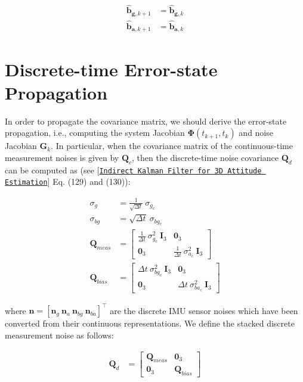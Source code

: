 \begin{align*} \hat{\mathbf{b}}_{\mathbf{g},k+1} &= \hat{\mathbf{b}}_{\mathbf{g},k}\\ \hat{\mathbf{b}}_{\mathbf{a},k+1} &= \hat{\mathbf{b}}_{\mathbf{a},k} \end{align*}\hypertarget{propagation_error_prop}{}\section{Discrete-\/time Error-\/state Propagation}\label{propagation_error_prop}
In order to propagate the covariance matrix, we should derive the error-\/state propagation, i.\+e., computing the system Jacobian $\boldsymbol{\Phi}(t_{k+1},t_k)$ and noise Jacobian $\mathbf{G}_{k}$. In particular, when the covariance matrix of the continuous-\/time measurement noises is given by $\mathbf{Q}_c$, then the discrete-\/time noise covariance $\mathbf{Q}_d$ can be computed as (see \mbox{[}\href{http://mars.cs.umn.edu/tr/reports/Trawny05b.pdf}{\tt Indirect Kalman Filter for 3D Attitude Estimation}\mbox{]} \cite{Trawny2005TR} Eq. (129) and (130))\+:

\begin{align*} \sigma_{g} &= \frac{1}{\sqrt{\Delta t}}~ \sigma_{g_c} \\ \sigma_{bg} &= \sqrt{\Delta t}~ \sigma_{bg_c} \\[1em] \mathbf{Q}_{meas} &= \begin{bmatrix} \frac{1}{\Delta t}~ \sigma_{g_c}^2~ \mathbf{I}_3 & \mathbf{0}_3 \\ \mathbf{0}_3 & \frac{1}{\Delta t}~ \sigma_{a_c}^2~ \mathbf{I}_3 \end{bmatrix} \\ \mathbf{Q}_{bias} &= \begin{bmatrix} \Delta t~ \sigma_{bg_c}^2~ \mathbf{I}_3 & \mathbf{0}_3 \\ \mathbf{0}_3 & \Delta t~ \sigma_{ba_c}^2~ \mathbf{I}_3 \end{bmatrix} \end{align*}

where $\mathbf{n} = [ \mathbf{n}_g ~ \mathbf{n}_a ~ \mathbf{n}_{bg} ~ \mathbf{n}_{ba} ]^\top$ are the discrete I\+MU sensor noises which have been converted from their continuous representations. We define the stacked discrete measurement noise as follows\+:

\begin{align*} \mathbf{Q}_{d} &= \begin{bmatrix} \mathbf{Q}_{meas} & \mathbf{0}_3 \\ \mathbf{0}_3 & \mathbf{Q}_{bias} \end{bmatrix} \end{align*}

